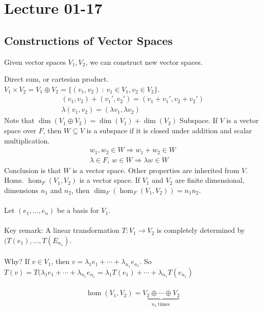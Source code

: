 \documentclass[class=scrartcl, crop=false]{standalone}
\date{2020-01-17}
\begin{document}
\section{Lecture 01-17}

\subsection{Constructions of Vector Spaces}

Given vector spaces $V_1, V_2$, we can construct new vector spaces.
\begin{enumerate}
  \ii
  Direct sum, or cartesian product. $V_1 \times V_2 = V_1 \oplus V_2 = \{(v_1, v_2) \ : \ v_1 \in V_1, v_2 \in V_2\}$.
  \begin{gather*}
    (v_1, v_2) + (v_1', v_2') = (v_1 + v_1', v_2 + v_2') \\
    \lambda(v_1, v_2) = (\lambda v_1, \lambda v_2)
  \end{gather*} 
  Note that $\dim(V_1 \oplus V_2) = \dim(V_1) + \dim(V_2)$
  \ii
  Subspace. If $V$ is a vector space over $F$, then $W \subseteq V$ is a subspace if it is closed under addition and scalar multiplication.
   \begin{gather*}
    w_1, w_2 \in W \Rightarrow w_1 + w_2 \in W \\
    \lambda \in F,\  w \in W \Rightarrow \lambda w \in W
  \end{gather*} 
  Conclusion is that $W$ is a vector space. Other properties are inherited from $V$.
  \ii
  Homs. $\hom_F(V_1, V_2)$ is a vector space. If $V_1$ and $V_2$ are finite dimensional, dimensions $n_1$ and $n_2$, then $\dim_F(\hom_F(V_1, V_2)) = n_1n_2$. %
  \\\\
  Let $(e_1, \dots, e_n)$ be a basis for $V_1$.
  \\\\
  Key remark: A linear transformation $T: V_1 \to V_2$ is completely determined by $(T(e_1), \dots, T(E_{n_1})$.
  \\\\
  Why? If $v \in V_1$, then $v = \lambda_1 e_1 + \cdots + \lambda_{n_1} e_{n_1}$. So $T(v) = T(\lambda_1 e_1 + \cdots + \lambda_{n_1}e_{n_1} = \lambda_1 T(e_1) + \cdots + \lambda_{n_1} T(e_{n_1})$
  \\\\
  \begin{gather*}
    \hom(V_1, V_2) = \underbrace{V_2 \oplus \cdots \oplus V_2}_{n_1 \ \text{times} \ } %

\end{gather*}
\end{enumerate}
\end{document}
